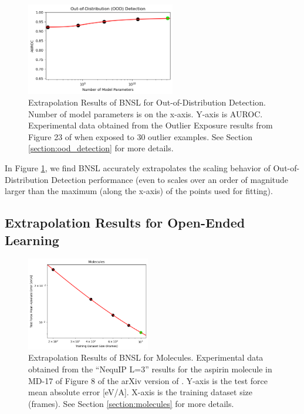 \documentclass{article} %
\begin{document}
\begin{figure}[htbp]
    \centering
\includegraphics[width=0.58\textwidth]{figures/ood_detection/ood_detection.png}
    \caption{
Extrapolation Results of BNSL for Out-of-Distribution Detection. Number of model parameters is on the x-axis. Y-axis is AUROC. Experimental data obtained from the Outlier Exposure results from Figure 23 of \cite{bai2022training} when exposed to 30 outlier examples. See Section \ref{section:ood_detection} for more details.
    }
    \label{fig:ood_detection}
\end{figure}

In Figure \ref{fig:ood_detection}, we find BNSL accurately extrapolates the scaling behavior of Out-of-Distribution Detection performance (even to scales over an order of magnitude larger than the maximum (along the x-axis) of the points used for fitting).

\vspace{5mm}

\iffalse
\subsection{Extrapolation Results for Open-Ended Learning}
\label{section:open-ended}

\begin{figure}[htbp]
    \centering
\includegraphics[width=0.48\textwidth]{figures/molecules/molecules.png}
    \caption{
Extrapolation Results of BNSL for Molecules. Experimental data obtained from the ``NequIP L=3'' results for the aspirin molecule in MD-17 of Figure 8 of the arXiv version of \cite{Batzner_2022}. Y-axis is the test force mean absolute error [eV/A]. X-axis is the training dataset size (frames). See Section \ref{section:molecules} for more details.
    }
    \label{fig:molecules}
\end{figure}
\end{document}
